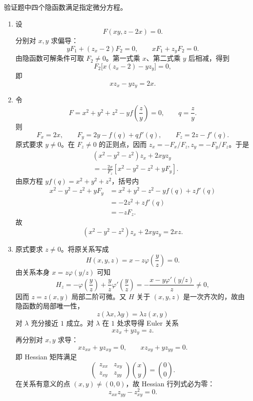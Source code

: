 \begin{xexercise}[20.1.4 练习题 5]
验证题中四个隐函数满足指定微分方程。
\end{xexercise}
\begin{xsolution}
\begin{enumerate}[label=(\arabic*)]
  \item 设
  \[
    F(xy,z-2x)=0.
  \]
  分别对 $x,y$ 求偏导：
  \[
    yF_1+(z_x-2)F_2=0,
    \qquad
    xF_1+z_yF_2=0.
  \]
  由隐函数可解条件可取 $F_2\ne0$。第一式乘 $x$、第二式乘 $y$ 后相减，得到
  \[
    F_2\bigl[x(z_x-2)-yz_y\bigr]=0,
  \]
  即
  \[
    \boxed{xz_x-yz_y=2x}.
  \]

  \item 令
  \[
    F=x^2+y^2+z^2-yf\!\left(\frac zy\right)=0,
    \qquad q=\frac zy.
  \]
  则
  \[
    F_x=2x,
    \qquad
    F_y=2y-f(q)+qf'(q),
    \qquad
    F_z=2z-f'(q).
  \]
  原式要求 $y\ne0$。在 $F_z\ne0$ 的正则点，因而 $z_x=-F_x/F_z,z_y=-F_y/F_z$。于是
  \begin{align*}
    &(x^2-y^2-z^2)z_x+2xyz_y\\
    &=-\frac{2x}{F_z}
      \left[x^2-y^2-z^2+yF_y\right].
  \end{align*}
  由原方程 $yf(q)=x^2+y^2+z^2$，括号内
  \begin{align*}
    x^2-y^2-z^2+yF_y
    &=x^2+y^2-z^2-yf(q)+zf'(q)\\
    &=-2z^2+zf'(q)\\
    &=-zF_z.
  \end{align*}
  故
  \[
    \boxed{(x^2-y^2-z^2)z_x+2xyz_y=2xz}.
  \]

  \item 原式要求 $z\ne0$。将原关系写成
  \[
    H(x,y,z)=x-z\varphi\!\left(\frac yz\right)=0.
  \]
  由关系本身 $x=z\varphi(y/z)$ 可知
  \[
    H_z=-\varphi\!\left(\frac yz\right)
         +\frac yz\varphi'\!\left(\frac yz\right)
       =-\frac{x-y\varphi'(y/z)}{z}\ne0,
  \]
  因而 $z=z(x,y)$ 局部二阶可微。又 $H$ 关于 $(x,y,z)$ 是一次齐次的，故由隐函数的局部唯一性，
  \[
    z(\lambda x,\lambda y)=\lambda z(x,y)
  \]
  对 $\lambda$ 充分接近 $1$ 成立。对 $\lambda$ 在 $1$ 处求导得 Euler 关系
  \[
    xz_x+yz_y=z.
  \]
  再分别对 $x,y$ 求导：
  \[
    xz_{xx}+yz_{xy}=0,
    \qquad
    xz_{xy}+yz_{yy}=0.
  \]
  即 Hessian 矩阵满足
  \[
    \begin{pmatrix}
      z_{xx}&z_{xy}\\
      z_{xy}&z_{yy}
    \end{pmatrix}
    \binom xy=\binom00.
  \]
  在关系有意义的点 $(x,y)\ne(0,0)$，故 Hessian 行列式必为零：
  \[
    \boxed{z_{xx}z_{yy}-z_{xy}^2=0}.
  \]


\end{enumerate}
\end{xsolution}
